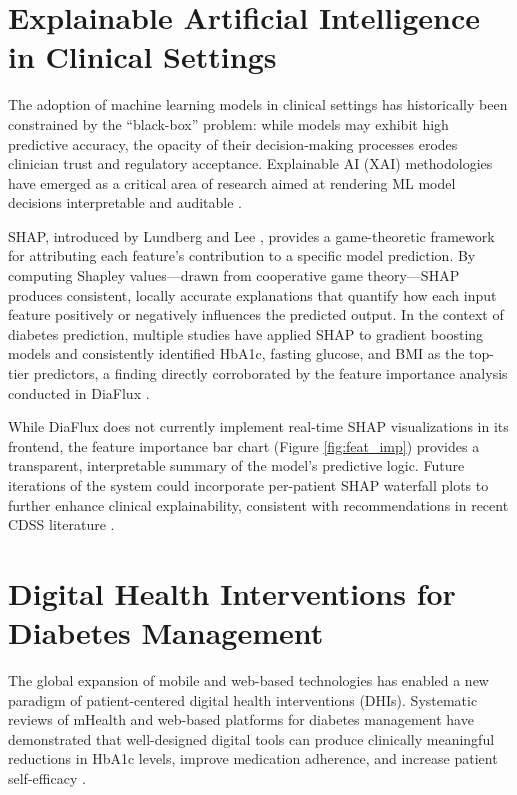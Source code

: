 \documentclass[12pt,a4paper]{report}
\begin{document}
\section{Explainable Artificial Intelligence in Clinical Settings}
The adoption of machine learning models in clinical settings has historically been constrained by the ``black-box'' problem: while models may exhibit high predictive accuracy, the opacity of their decision-making processes erodes clinician trust and regulatory acceptance. Explainable AI (XAI) methodologies have emerged as a critical area of research aimed at rendering ML model decisions interpretable and auditable \cite{abdar_uncertainty}.

SHAP, introduced by Lundberg and Lee \cite{lundberg_shap}, provides a game-theoretic framework for attributing each feature's contribution to a specific model prediction. By computing Shapley values---drawn from cooperative game theory---SHAP produces consistent, locally accurate explanations that quantify how each input feature positively or negatively influences the predicted output. In the context of diabetes prediction, multiple studies have applied SHAP to gradient boosting models and consistently identified HbA1c, fasting glucose, and BMI as the top-tier predictors, a finding directly corroborated by the feature importance analysis conducted in DiaFlux \cite{lundberg_shap}.

While DiaFlux does not currently implement real-time SHAP visualizations in its frontend, the feature importance bar chart (Figure \ref{fig:feat_imp}) provides a transparent, interpretable summary of the model's predictive logic. Future iterations of the system could incorporate per-patient SHAP waterfall plots to further enhance clinical explainability, consistent with recommendations in recent CDSS literature \cite{abdar_uncertainty}.

\section{Digital Health Interventions for Diabetes Management}
The global expansion of mobile and web-based technologies has enabled a new paradigm of patient-centered digital health interventions (DHIs). Systematic reviews of mHealth and web-based platforms for diabetes management have demonstrated that well-designed digital tools can produce clinically meaningful reductions in HbA1c levels, improve medication adherence, and increase patient self-efficacy \cite{who_dhi_report}.
\end{document}
